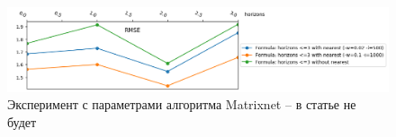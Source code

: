 \documentclass[14pt]{matmex-diploma}
\begin{document}
\begin{figure}
\centering
\includegraphics[width=\linewidth]{images/pic4_params.png}
\caption{Эксперимент с параметрами алгоритма Matrixnet -- в статье не будет}
\label{pic4_params}
\end{figure}


\setmonofont[Mapping=tex-text]{CMU Typewriter Text}

 
\end{document}
